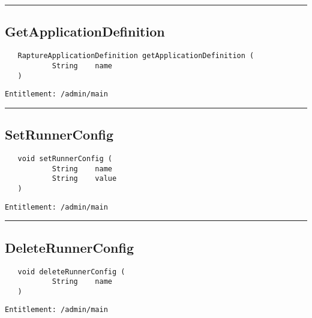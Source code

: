 \rule{12cm}{2pt}
\subsection{GetApplicationDefinition}
\label{Api:GetApplicationDefinition}
\begin{Verbatim}
   RaptureApplicationDefinition getApplicationDefinition (
           String    name
   )
\end{Verbatim}
\begin{Verbatim}[formatcom=\color{Maroon}]
  Entitlement: /admin/main
\end{Verbatim}



\rule{12cm}{2pt}
\subsection{SetRunnerConfig}
\label{Api:SetRunnerConfig}
\begin{Verbatim}
   void setRunnerConfig (
           String    name
           String    value
   )
\end{Verbatim}
\begin{Verbatim}[formatcom=\color{Maroon}]
  Entitlement: /admin/main
\end{Verbatim}



\rule{12cm}{2pt}
\subsection{DeleteRunnerConfig}
\label{Api:DeleteRunnerConfig}
\begin{Verbatim}
   void deleteRunnerConfig (
           String    name
   )
\end{Verbatim}
\begin{Verbatim}[formatcom=\color{Maroon}]
  Entitlement: /admin/main
\end{Verbatim}



